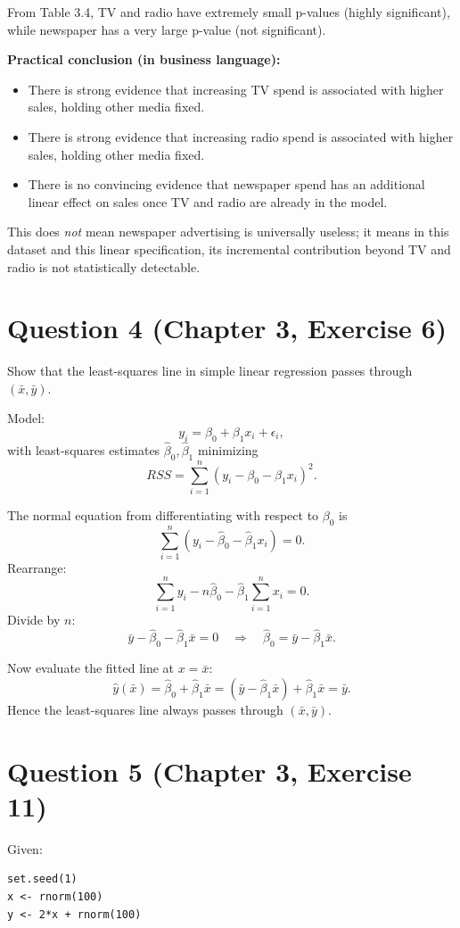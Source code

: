 \documentclass[12pt]{article}
\begin{document}
From Table 3.4, TV and radio have extremely small p-values (highly significant), while newspaper has a very large p-value (not significant).

\textbf{Practical conclusion (in business language):}
\begin{itemize}
\item There is strong evidence that increasing TV spend is associated with higher sales, holding other media fixed.
\item There is strong evidence that increasing radio spend is associated with higher sales, holding other media fixed.
\item There is no convincing evidence that newspaper spend has an additional linear effect on sales once TV and radio are already in the model.
\end{itemize}

This does \emph{not} mean newspaper advertising is universally useless; it means in this dataset and this linear specification, its incremental contribution beyond TV and radio is not statistically detectable.

\section*{Question 4 (Chapter 3, Exercise 6)}
Show that the least-squares line in simple linear regression passes through $(\bar{x},\bar{y})$.

Model:
\[
y_i = \beta_0 + \beta_1 x_i + \epsilon_i,
\]
with least-squares estimates $\hat\beta_0,\hat\beta_1$ minimizing
\[
RSS = \sum_{i=1}^n (y_i - \beta_0 - \beta_1 x_i)^2.
\]

The normal equation from differentiating with respect to $\beta_0$ is
\[
\sum_{i=1}^n (y_i - \hat\beta_0 - \hat\beta_1 x_i) = 0.
\]
Rearrange:
\[
\sum_{i=1}^n y_i - n\hat\beta_0 - \hat\beta_1\sum_{i=1}^n x_i = 0.
\]
Divide by $n$:
\[
\bar{y} - \hat\beta_0 - \hat\beta_1\bar{x} = 0
\quad\Rightarrow\quad
\hat\beta_0 = \bar{y} - \hat\beta_1\bar{x}.
\]

Now evaluate the fitted line at $x=\bar{x}$:
\[
\hat{y}(\bar{x}) = \hat\beta_0 + \hat\beta_1\bar{x}
= (\bar{y} - \hat\beta_1\bar{x}) + \hat\beta_1\bar{x}
= \bar{y}.
\]
Hence the least-squares line always passes through $(\bar{x},\bar{y})$.

\section*{Question 5 (Chapter 3, Exercise 11)}
Given:
\begin{verbatim}
set.seed(1)
x <- rnorm(100)
y <- 2*x + rnorm(100)
\end{verbatim}
\end{document}
